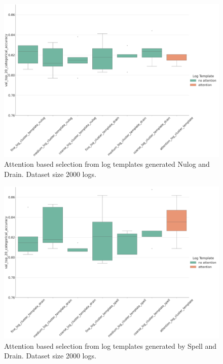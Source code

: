 \begin{figure}[H]
    \centering
    \includegraphics[keepaspectratio=true,scale=0.15]{figures/5_results/drain+nulog.png}
    \caption{Attention based selection from log templates generated Nulog and Drain. Dataset size 2000 logs.}
    \label{fig:drain_nulog}
\end{figure}

\begin{figure}[H]
    \centering
    \includegraphics[keepaspectratio=true,scale=0.15]{figures/5_results/drain+spell.png}
    \caption{Attention based selection from log templates generated by Spell and Drain. Dataset size 2000 logs.}
    \label{fig:drain_spell}
\end{figure}

